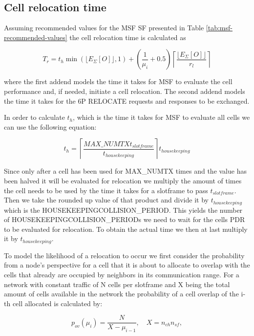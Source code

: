 \documentclass{comnets-thesis}
\begin{document}
\subsection{ Cell relocation time }
Assuming recommended values for the \ac{MSF} \ac{SF} presented in Table \ref{tab:msf-recommended-values} the cell relocation time is calculated as


\begin{equation}
    T_r = t_h \min(\lfloor E_\Sigma[O] \rfloor, 1) + \left(\frac{1}{\mu_i} + 0.5\right) \left\lceil \frac{\lfloor E_\Sigma[O] \rfloor}{r_l} \right\rceil
    \label{eq:analytical-T_r}
\end{equation}

where the first addend models the time it takes for \ac{MSF} to evaluate the cell performance and, if needed, initiate a cell relocation. The second addend models the time it takes for the \ac{6P} RELOCATE requests and responses to be exchanged.

In order to calculate $t_h$, which is the time it takes for \ac{MSF} to evaluate all cells we can use the following equation:

\begin{equation}
    t_h = \left\lceil\frac{MAX\_NUMTX t_{slotframe}}{t_{housekeeping}}\right\rceil t_{housekeeping}
    \label{eq:analytical-t_h}
\end{equation}

Since only after a cell has been used for MAX\_NUMTX times and the value has been halved it will be evaluated for relocation we multiply the amount of times the cell needs to be used by the time it takes for a slotframe to pass $t_{slotframe}$. Then we take the rounded up value of that product  and divide it by $t_{housekeeping}$ which is the HOUSEKEEPINGCOLLISION\_PERIOD. This yields the number of HOUSEKEEPINGCOLLISION\_PERIODs we need to wait for the cells \ac{PDR} to be evaluated for relocation. To obtain the actual time we then at last multiply it by $t_{housekeeping}$.

To model the likelihood of a relocation to occur we first consider the probability from a node's perspective for a cell that it is about to allocate to overlap with the cells that already are occupied by neighbors in its communication range. For a network with constant traffic of N cells per slotframe and X being the total amount of cells available in the network the probability of a cell overlap of the i-th cell allocated is calculated by:

\begin{equation}
    p_{ov} (\mu_i) = \frac{N}{X-\mu_{i-1}}, \quad X=n_{ch} n_{sf} ,
    \label{eq:analytical-p_ov}
\end{equation}
\end{document}
